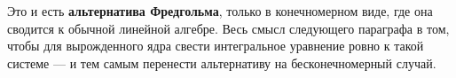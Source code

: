\begin{idea}
Это и есть \textbf{альтернатива Фредгольма}, только в конечномерном виде, где
она сводится к обычной линейной алгебре. Весь смысл следующего параграфа в
том, чтобы для вырожденного ядра свести интегральное уравнение ровно к такой
системе — и тем самым перенести альтернативу на бесконечномерный случай.
\end{idea}
